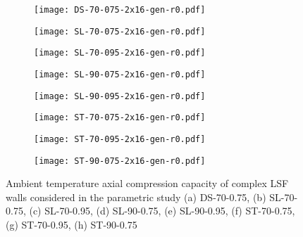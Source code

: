 \begin{figure}[!htbp]
	\centering
	\begin{subfigure}[b]{0.4\textwidth}
			\centering
		\texttt{[image: DS-70-075-2x16-gen-r0.pdf]}
		\caption{}
		\label{subfig:DS-70-075-2x16-gen-r0}
	\end{subfigure}
	\begin{subfigure}[b]{0.4\textwidth}
			\centering
		\texttt{[image: SL-70-075-2x16-gen-r0.pdf]}
		\caption{}
		\label{subfig:SL-70-075-2x16-gen-r0}
	\end{subfigure}
	\begin{subfigure}[b]{0.4\textwidth}
			\centering
		\texttt{[image: SL-70-095-2x16-gen-r0.pdf]}
		\caption{}
		\label{subfig:SL-70-095-2x16-gen-r0}
	\end{subfigure}
	\begin{subfigure}[b]{0.4\textwidth}
			\centering
		\texttt{[image: SL-90-075-2x16-gen-r0.pdf]}
		\caption{}
		\label{subfig:SL-90-075-2x16-gen-r0}
	\end{subfigure}
	\begin{subfigure}[b]{0.4\textwidth}
			\centering
		\texttt{[image: SL-90-095-2x16-gen-r0.pdf]}
		\caption{}
		\label{subfig:SL-90-095-2x16-gen-r0}
	\end{subfigure}
	\begin{subfigure}[b]{0.4\textwidth}
			\centering
		\texttt{[image: ST-70-075-2x16-gen-r0.pdf]}
		\caption{}
		\label{subfig:ST-70-075-2x16-gen-r0}
	\end{subfigure}
	\begin{subfigure}[b]{0.4\textwidth}
			\centering
		\texttt{[image: ST-70-095-2x16-gen-r0.pdf]}
		\caption{}
		\label{subfig:ST-70-095-2x16-gen-r0}
	\end{subfigure}
	\begin{subfigure}[b]{0.4\textwidth}
			\centering
		\texttt{[image: ST-90-075-2x16-gen-r0.pdf]}
		\caption{}
		\label{subfig:ST-90-075-2x16-gen-r0}
	\end{subfigure}
	   \caption{Ambient temperature axial compression capacity of complex LSF walls considered in the parametric study (a) DS-70-0.75, (b) SL-70-0.75, (c) SL-70-0.95, (d) SL-90-0.75, (e) SL-90-0.95, (f) ST-70-0.75, (g) ST-70-0.95, (h) ST-90-0.75}
	   \label{fig:ambient-capacity-parametric}
\end{figure}

